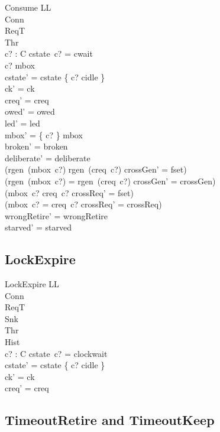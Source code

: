 \documentclass[a4paper,10pt,fleqn]{article}
\begin{document}
\begin{schema}{Consume}
  \Delta LL \\
  \Xi Conn \\
  \Xi ReqT \\
  \Xi Thr \\
  c? : C
\where
  cstate~c? = cwait \\
  c? \in \dom mbox \\
  cstate' = cstate \oplus \{ c? \mapsto cidle \} \\
  ck' = ck \\
  creq' = creq \\
  owed' = owed \\
  led' = led \\
  mbox' = \{ c? \} \ndres mbox \\
  broken' = broken \\
  deliberate' = deliberate \\
  (rgen~(mbox~c?) \neq rgen~(creq~c?) \implies crossGen' = fset) \\
  (rgen~(mbox~c?) = rgen~(creq~c?) \implies crossGen' = crossGen) \\
  (mbox~c? \neq creq~c? \implies crossReq' = fset) \\
  (mbox~c? = creq~c? \implies crossReq' = crossReq) \\
  wrongRetire' = wrongRetire \\
  starved' = starved
\end{schema}

\subsection{LockExpire}

\begin{schema}{LockExpire}
  \Delta LL \\
  \Xi Conn \\
  \Xi ReqT \\
  \Xi Snk \\
  \Xi Thr \\
  \Xi Hist \\
  c? : C
\where
  cstate~c? = clockwait \\
  cstate' = cstate \oplus \{ c? \mapsto cidle \} \\
  ck' = ck \\
  creq' = creq
\end{schema}

\subsection{TimeoutRetire and TimeoutKeep}
\end{document}
